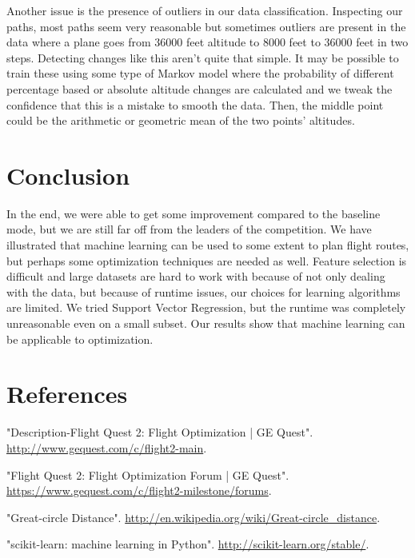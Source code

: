 \documentclass{article}[12pt]
\begin{document}
\begin{multicols}{2}
Another issue is the presence of outliers in our data classification. Inspecting our paths, most paths seem very reasonable but sometimes outliers are present in the data where a plane goes from 36000 feet altitude to 8000 feet to 36000 feet in two steps. Detecting changes like this aren't quite that simple. It may be possible to train these using some type of Markov model where the probability of different percentage based or absolute altitude changes are calculated and we tweak the confidence that this is a mistake to smooth the data. Then, the middle point could be the arithmetic or geometric mean of the two points' altitudes.

\section{Conclusion}
In the end, we were able to get some improvement compared to the baseline mode, but we are still far off from the leaders of the competition. We have illustrated that machine learning can be used to some extent to plan flight routes, but perhaps some optimization techniques are needed as well. Feature selection is difficult and large datasets are hard to work with because of not only dealing with the data, but because of runtime issues, our choices for learning algorithms are limited. We tried Support Vector Regression, but the runtime was completely unreasonable even on a small subset. Our results show that machine learning can be applicable to optimization.

\section{References}
\begin{thebibliography}{1}

 "Description-Flight Quest 2: Flight Optimization | GE Quest". \url{http://www.gequest.com/c/flight2-main}.

 "Flight Quest 2: Flight Optimization Forum | GE Quest". \url{https://www.gequest.com/c/flight2-milestone/forums}.

 "Great-circle Distance". \url{http://en.wikipedia.org/wiki/Great-circle_distance}.

 "scikit-learn: machine learning in Python". \url{http://scikit-learn.org/stable/}.

\end{thebibliography}
\end{multicols}
\end{document}
